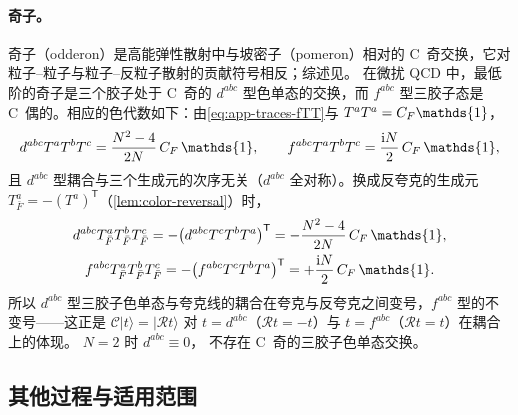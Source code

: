 \documentclass[UTF8,a4paper,11pt,fontset=fandol]{ctexart}
\let\amsmathbb\mathbb
\renewcommand{\mathbb}[1]{\ifx1#1\mathds{1}\else\amsmathbb{#1}\fi}
\theoremstyle{cplain}
\theoremstyle{cdefinition}
\theoremstyle{cremark}
\numberwithin{equation}{section}
\newcommand{\tp}{\mathsf{T}}                         %
\newcommand{\Cop}{\mathcal{C}}                       %
\newcommand{\Rop}{\mathcal{R}}                       %
\newcommand{\ii}{\mathrm{i}}                        %
\begin{document}
\paragraph{奇子。}奇子（odderon）是高能弹性散射中与坡密子（pomeron）相对的 C~奇交换\cite{LukaszukNicolescu1973}，它对粒子--粒子与粒子--反粒子散射的贡献符号相反；综述见\cite{Ewerz2003}。
在微扰 QCD 中，最低阶的奇子是三个胶子处于 C~奇的 $d^{abc}$ 型色单态的交换，而 $f^{abc}$ 型三胶子态是 C~偶的\cite{Ewerz2003}。相应的色代数如下：由\cref{eq:app-traces-fTT}与 $T^aT^a=C_F\mathbb 1$，
\begin{equation}\label{eq:app-glue-odd}
d^{abc}T^aT^bT^c=\frac{N^2-4}{2N}\,C_F\,\mathbb 1,\qquad f^{abc}T^aT^bT^c=\frac{\ii N}{2}\,C_F\,\mathbb 1 ,
\end{equation}
且 $d^{abc}$ 型耦合与三个生成元的次序无关（$d^{abc}$ 全对称）。换成反夸克的生成元 $T^a_{\bar F}=-(T^a)^{\tp}$（\cref{lem:color-reversal}）时，
\begin{equation*}
\begin{gathered}
d^{abc}T^a_{\bar F}T^b_{\bar F}T^c_{\bar F}=-\bigl(d^{abc}T^cT^bT^a\bigr)^{\tp}=-\frac{N^2-4}{2N}\,C_F\,\mathbb 1,\\
f^{abc}T^a_{\bar F}T^b_{\bar F}T^c_{\bar F}=-\bigl(f^{abc}T^cT^bT^a\bigr)^{\tp}=+\frac{\ii N}{2}\,C_F\,\mathbb 1 .
\end{gathered}
\end{equation*}
所以 $d^{abc}$ 型三胶子色单态与夸克线的耦合在夸克与反夸克之间变号，$f^{abc}$ 型的不变号——这正是 $\Cop|t\rangle=|\Rop t\rangle$ 对 $t=d^{abc}$（$\Rop t=-t$）与 $t=f^{abc}$（$\Rop t=t$）在耦合上的体现。
$N=2$ 时 $d^{abc}\equiv0$，
不存在 C~奇的三胶子色单态交换。

\subsection{其他过程与适用范围}\label{sec:applications-other}
\end{document}
